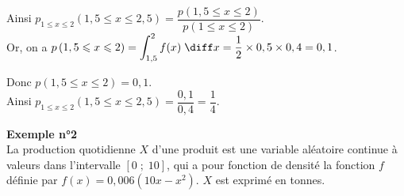 \begin{itemize}
\begin{itemize}

\vspace*{.3cm}

Ainsi $p_{1 \leqslant x \leqslant 2}\left(1,5 \leqslant x \leqslant 2,5\right) = \dfrac{p\left(1,5 \leqslant x \leqslant 2\right)}{p\left(1 \leqslant x \leqslant 2\right)}$. \vspace*{.3cm} \\


Or, on a $p\left(1,5 \leqslant x \leqslant 2\right) = \displaystyle{\int_{1,5}^2 f(x) \; \diff x} = \dfrac{1}{2} \times 0,5 \times 0,4 = 0,1$. \\

\vspace*{.3cm}

Donc $p\left(1,5 \leqslant x \leqslant 2\right) = 0,1$. \\

Ainsi $p_{1 \leqslant x \leqslant 2}\left(1,5 \leqslant x \leqslant 2,5\right) = \dfrac{0,1}{0,4} = \dfrac{1}{4}$.

\end{itemize}
\end{itemize} 

\newpage

\textbf{Exemple n°2} \\

La production quotidienne $X$ d'une produit est une variable aléatoire continue à valeurs dans l'intervalle $\left[0 \; ; \; 10\right]$, qui a pour fonction de densité la fonction $f$ définie par $f(x) = 0,006\left(10x-x^2\right)$. $X$ est exprimé en tonnes. \\

